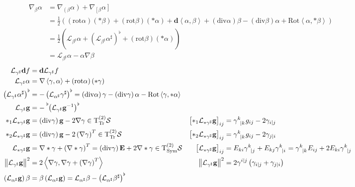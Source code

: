 \documentclass[a4paper,7pt]{scrartcl}
\newcommand{\surf}{\mathcal{S}}
\newcommand{\T}{\mathrm{T}}
\newcommand{\tpsprop}[2]{\T^{(#1)}_{#2}\surf}
\newcommand{\ttssym}{\tpsprop{2}{\mathrm{Sym}}}
\newcommand{\ttstrfree}{\tpsprop{2}{\mathrm{Tr}}}
\newcommand{\exd}{\mathbf{d}}
\newcommand{\rot}{\mathrm{rot}}
\renewcommand{\div}{\mathrm{div}}
\newcommand{\Rot}{\mathrm{Rot}}
\newcommand{\lie}{\mathcal{L}}
\newcommand{\gb}{\mathbf{g}}
\newcommand{\Eb}{\mathbf{E}}
\begin{document}
\begin{align*}
    \nabla_{\beta}\alpha &= \nabla_{\left( \beta \!\right.}\!\left. \alpha \right) + \nabla_{\left[ \beta \!\right.}\!\left. \alpha \right] \\
        &= \frac{1}{2}\left( \left( \rot\alpha \right)\left( *\beta \right) + \left( \rot\beta \right)\left( *\alpha \right) + \exd\left\langle \alpha, \beta \right\rangle 
                            +\left( \div\alpha \right)\beta - \left( \div\beta \right)\alpha + \Rot\left\langle \alpha , *\beta \right\rangle\right)\\
        &= \frac{1}{2}\left( \lie_{\beta^{\sharp}}\alpha + \left( \lie_{\beta^{\sharp}}\alpha^{\sharp} \right)^{\flat} +  \left( \rot\beta \right)\left( *\alpha \right) \right)\\
        &= \lie_{\beta^{\sharp}}\alpha - \alpha\nabla\beta
  \end{align*}
  \begin{align*}
    \lie_{\gamma^{\sharp}}\exd f &= \exd\lie_{\gamma^{\sharp}}f\\
    \lie_{\gamma^{\sharp}}\alpha &= \nabla\left\langle \gamma, \alpha \right\rangle + \left( \rot\alpha \right)\left( *\gamma \right)\\
    \left( \lie_{\gamma^{\sharp}}\alpha^{\sharp} \right)^{\flat}
             &= -\left( \lie_{\alpha^{\sharp}}\gamma^{\sharp} \right)^{\flat}
              = \left( \div\alpha \right)\gamma - \left( \div\gamma \right)\alpha - \Rot\left\langle \gamma, *\alpha \right\rangle\\
    \lie_{\gamma^{\sharp}}\gb &= -\tensor[^{\flat}]{\left( \lie_{\gamma^{\sharp}}\gb^{-1} \right)}{^{\flat}} \\
    *_{1}\lie_{*\gamma^{\sharp}}\gb &= \left(\div\gamma\right)\gb - 2\nabla\gamma \in \ttstrfree
              &\left[ *_{1}\lie_{*\gamma^{\sharp}}\gb \right]_{ij} &= \tensor{\gamma}{^{k}_{|k}}g_{ij} - 2\gamma_{i|j}\\
    *_{2}\lie_{*\gamma^{\sharp}}\gb &= \left(\div\gamma\right)\gb - 2\left(\nabla\gamma\right)^{T} \in \ttstrfree
              &\left[ *_{2}\lie_{*\gamma^{\sharp}}\gb \right]_{ij} &= \tensor{\gamma}{^{k}_{|k}}g_{ij} - 2\gamma_{j|i}\\
    \lie_{*\gamma^{\sharp}}\gb &=\nabla * \gamma + \left( \nabla * \gamma \right)^{T} = \left(\div\gamma\right)\Eb + 2\nabla * \gamma \in \ttssym
              &\left[ \lie_{*\gamma^{\sharp}}\gb \right]_{ij} 
                    &=  E_{ki}\tensor{\gamma}{^{k}_{|j}} + E_{kj}\tensor{\gamma}{^{k}_{|i}}
                     =  \tensor{\gamma}{^{k}_{|k}}E_{ij} + 2 E_{ki}\tensor{\gamma}{^{k}_{|j}}\\
    \left\| \lie_{\gamma^{\sharp}}\gb \right\|^{2} &= 2\left\langle \nabla\gamma , \nabla\gamma+\left( \nabla\gamma \right)^{T} \right\rangle
              & \left\| \lie_{\gamma^{\sharp}}\gb \right\|^{2} &= 2\gamma^{i|j}\left( \gamma_{i|j} + \gamma_{j|i} \right)\\
    \left( \lie_{\alpha^{\sharp}}\gb \right)\beta &= \beta \left( \lie_{\alpha^{\sharp}}\gb \right)
                = \lie_{\alpha^{\sharp}}\beta - \left( \lie_{\alpha^{\sharp}}\beta^{\sharp} \right)^{\flat}
  \end{align*}
\end{document}
